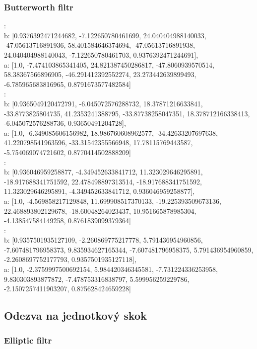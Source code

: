 \subsubsection{Butterworth filtr}
:\\
b: [0.9376392471244682, -7.122650780461699, 24.040404988140033, -47.05613716891936, 58.401584646374694, -47.05613716891938, 24.040404988140043, -7.122650780461703, 0.9376392471244691],\\
a: [1.0, -7.474103865341405, 24.821387450286817, -47.8060939570514, 58.38367566896905, -46.291412392552274, 23.273442639899493, -6.785965683816965, 0.8791673577482584]\\

:\\
b: [0.9365049120472791, -6.045072576288732, 18.37871216633841, -33.8773825804735, 41.2353241388795, -33.87738258047351, 18.378712166338413, -6.045072576288736, 0.93650491204728],\\
a: [1.0, -6.349085606156982, 18.986760608962577, -34.42633207697638, 41.220798541963596, -33.31542355566948, 17.78115769443587, -5.754069074721602, 0.8770414502888209]\\

:\\
b: [0.936046959258877, -4.349452633841712, 11.323029646295891, -18.917688341751592, 22.478498897313514, -18.917688341751592, 11.323029646295891, -4.349452633841712, 0.936046959258877],\\
a: [1.0, -4.569858217129848, 11.699908517370133, -19.225393509673136, 22.468893802129678, -18.60048264023437, 10.951665878985304, -4.138547584149258, 0.8761839099379364]\\

:\\
b: [0.9357501935127109, -2.260869775217778, 5.791436954960856, -7.607481796958373, 9.835934627165344, -7.607481796958375, 5.791436954960859, -2.2608697752177793, 0.9357501935127118],\\
a: [1.0, -2.3759997500692154, 5.984420346345581, -7.731224336253958, 9.830303893877872, -7.478753316838797, 5.599956259229786, -2.1507257411903207, 0.875628424659228]\\

\subsection{Odezva na jednotkový skok}

\subsubsection{Elliptic filtr}

